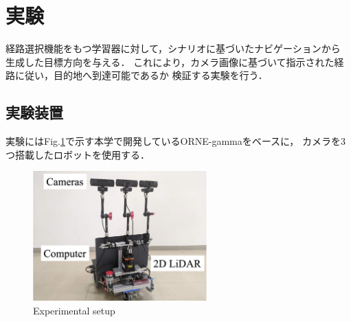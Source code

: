 \documentclass{sice-si}
\begin{document}
\section{実験}
経路選択機能をもつ学習器に対して，シナリオに基づいたナビゲーションから
生成した目標方向を与える．
これにより，カメラ画像に基づいて指示された経路に従い，目的地へ到達可能であるか
検証する実験を行う．

\subsection{実験装置}
実験にはFig.\ref{fig:gamma}で示す本学で開発しているORNE-gammaをベースに，
カメラを3つ搭載したロボットを使用する．
\begin{figure}[htbp]
    \centering
     \includegraphics[height=50mm]{./figs/gamma_sensor.png}
     \caption{Experimental setup}\label{fig:gamma}
\end{figure}
\end{document}
